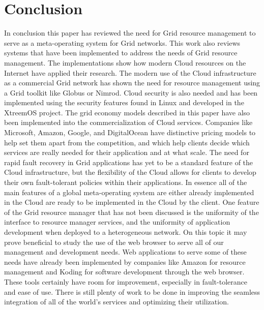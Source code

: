\documentclass[conference]{IEEEtran}
\begin{document}
\section{\textbf{Conclusion}}
In conclusion this paper has reviewed the need for Grid resource management to serve as a meta-operating system for Grid networks. This work also reviews systems that have been implemented to address the needs of Grid resource management. The implementations show how modern Cloud resources on the Internet have applied their research. The modern use of the Cloud infrastructure as a commercial Grid network has shown the need for resource management using a Grid toolkit like Globus or Nimrod. Cloud security is also needed and has been implemented using the security features found in Linux and developed in the XtreemOS project. The grid economy models described in this paper have also been implemented into the commercialization of Cloud services. Companies like Microsoft, Amazon, Google, and DigitalOcean have distinctive pricing models to help set them apart from the competition, and which help clients decide which services are really needed for their application and at what scale. The need for rapid fault recovery in Grid applications has yet to be a standard feature of the Cloud infrastructure, but the flexibility of the Cloud allows for clients to develop their own fault-tolerant policies within their applications. In essence all of the main features of a global meta-operating system are either already implemented in the Cloud are ready to be implemented in the Cloud by the client. One feature of the Grid resource manager that has not been discussed is the uniformity of the interface to resource manager services, and the uniformity of application development when deployed to a heterogeneous network. On this topic it may prove beneficial to study the use of the web browser to serve all of our management and development needs. Web applications to serve some of these needs have already been implemented by companies like Amazon for resource management and Koding for software development through the web browser. These tools certainly have room for improvement, especially in fault-tolerance and ease of use. There is still plenty of work to be done in improving the seamless integration of all of the world's services and optimizing their utilization. 


\end{document}
